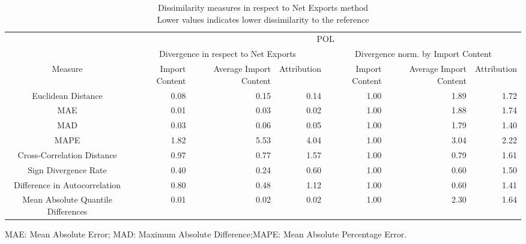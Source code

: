 \begin{table}[t]
\caption*{
{\large Dissimilarity measures in respect to Net Exports method} \\ 
{\small Lower values indicates lower dissimilarity to the reference}
} 
\fontsize{15.0pt}{18.0pt}\selectfont
\begin{tabular*}{\linewidth}{@{\extracolsep{\fill}}crrrrrr}
\toprule
 & \multicolumn{6}{c}{POL} \\ 
\cmidrule(lr){2-7}
 & \multicolumn{3}{c}{Divergence in respect to Net Exports} & \multicolumn{3}{c}{Divergence norm. by Import Content} \\ 
\cmidrule(lr){2-4} \cmidrule(lr){5-7}
Measure & Import Content & Average Import Content & Attribution & Import Content & Average Import Content & Attribution \\ 
\midrule\addlinespace[2.5pt]
Euclidean Distance & 0.08 & 0.15 & 0.14 & 1.00 & 1.89 & 1.72 \\ 
MAE & 0.01 & 0.03 & 0.02 & 1.00 & 1.88 & 1.74 \\ 
MAD & 0.03 & 0.06 & 0.05 & 1.00 & 1.79 & 1.40 \\ 
MAPE & 1.82 & 5.53 & 4.04 & 1.00 & 3.04 & 2.22 \\ 
Cross-Correlation Distance & 0.97 & 0.77 & 1.57 & 1.00 & 0.79 & 1.61 \\ 
Sign Divergence Rate & 0.40 & 0.24 & 0.60 & 1.00 & 0.60 & 1.50 \\ 
Difference in Autocorrelation & 0.80 & 0.48 & 1.12 & 1.00 & 0.60 & 1.41 \\ 
Mean Absolute Quantile Differences & 0.01 & 0.02 & 0.02 & 1.00 & 2.30 & 1.64 \\ 
\bottomrule
\end{tabular*}
\begin{minipage}{\linewidth}
MAE: Mean Absolute Error; MAD: Maximum Absolute Difference;MAPE: Mean Absolute Percentage Error.\\
\end{minipage}
\end{table}

